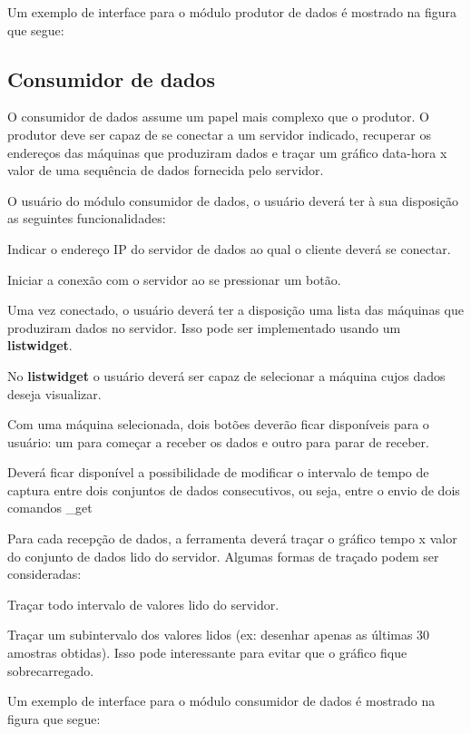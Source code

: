 Um exemplo de interface para o módulo produtor de dados é mostrado na figura que segue\+:



\subsection*{Consumidor de dados}

O consumidor de dados assume um papel mais complexo que o produtor. O produtor deve ser capaz de se conectar a um servidor indicado, recuperar os endereços das máquinas que produziram dados e traçar um gráfico data-\/hora x valor de uma sequência de dados fornecida pelo servidor.

O usuário do módulo consumidor de dados, o usuário deverá ter à sua disposição as seguintes funcionalidades\+:


\begin{DoxyItemize}
\item Indicar o endereço IP do servidor de dados ao qual o cliente deverá se conectar.
\item Iniciar a conexão com o servidor ao se pressionar um botão.
\item Uma vez conectado, o usuário deverá ter a disposição uma lista das máquinas que produziram dados no servidor. Isso pode ser implementado usando um {\bfseries listwidget}.
\item No {\bfseries listwidget} o usuário deverá ser capaz de selecionar a máquina cujos dados deseja visualizar.
\item Com uma máquina selecionada, dois botões deverão ficar disponíveis para o usuário\+: um para começar a receber os dados e outro para parar de receber.
\item Deverá ficar disponível a possibilidade de modificar o intervalo de tempo de captura entre dois conjuntos de dados consecutivos, ou seja, entre o envio de dois comandos \+\_\+get 
\end{DoxyItemize}

Para cada recepção de dados, a ferramenta deverá traçar o gráfico tempo x valor do conjunto de dados lido do servidor. Algumas formas de traçado podem ser consideradas\+:


\begin{DoxyItemize}
\item Traçar todo intervalo de valores lido do servidor.
\item Traçar um subintervalo dos valores lidos (ex\+: desenhar apenas as últimas 30 amostras obtidas). Isso pode interessante para evitar que o gráfico fique sobrecarregado.
\end{DoxyItemize}

Um exemplo de interface para o módulo consumidor de dados é mostrado na figura que segue\+:

 